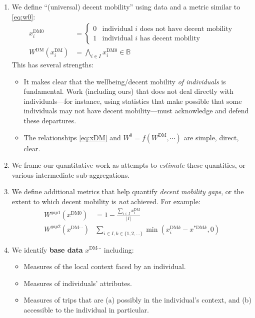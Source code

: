 \documentclass[a5paper,11pt]{article}
\newcommand{\DM}{\text{DM}}
\begin{document}
\begin{enumerate}[label=P\arabic*]
  \item We define “(universal) decent mobility” using data and a metric similar to \eqref{eq:w0}:
    \begin{align}
      x^{\DM0}_i       & = \begin{cases}
                             0 & \text{individual } i \text{ does not have decent mobility} \\
                             1 & \text{individual } i \text{ has decent mobility}
                           \end{cases} \\
      W^{\DM}(x^\DM_i) & = \bigwedge_{i \in I}{x^{\DM0}_i} \in \mathbb{B} \label{eq:wDM}
    \end{align}
    This has several strengths:
    \begin{itemize}
      \item It makes clear that the wellbeing/decent mobility \emph{of individuals} is fundamental.
        Work (including ours) that does not deal directly with individuals—for instance, using statistics that make possible that some individuals may not have decent mobility—must acknowledge and defend these departures.
      \item The relationships \eqref{eq:xDM} and $W^0 = f(W^{\DM}, \cdots)$ are simple, direct, clear.
    \end{itemize}
  \item We frame our quantitative work as attempts to \emph{estimate} these quantities, or various intermediate sub-aggregations.
  \item We define additional metrics that help quantify \emph{decent mobility gaps}, or the extent to which decent mobility is \emph{not} achieved.
    For example:
    \begin{align}
      W^{gap 1}(x^{\DM0}) & = 1 - \frac{\sum_{i \in I}{x^{\DM}_i}}{|I|} \\
      W^{gap 2}(x^{\DM \cdots}) & \sum_{i \in I, k \in \{1, 2, \ldots\}}{\min(x^{\DM k}_i - x^{\ast \DM k}, 0)}
    \end{align}
  \item We identify \textbf{base data} $x^{\DM \cdots}$ including:
    \begin{itemize}
      \item Measures of the local context faced by an individual.
      \item Measures of individuals' attributes.
      \item Measures of trips that are (a) possibly in the individual's context, and (b) accessible to the individual in particular.

\end{itemize}
\end{enumerate}
\end{document}
